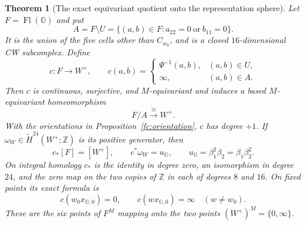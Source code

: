 \documentclass[11pt]{article}
\newtheorem{theorem}{Theorem}[section]
\theoremstyle{definition}
\begin{document}
\begin{theorem}[The exact equivariant quotient onto the representation sphere]
\label{fc:collapse}
Let $F=\operatorname{Fl}(\mathbb O)$ and put
\[
 A=F\setminus U=\{(a,b)\in F:a_{22}=0\ \text{or}\ b_{11}=0\}.
\]
It is the union of the five cells other than $C_{w_0}$, and is a
closed $16$-dimensional CW subcomplex. Define
\begin{equation}
 c:F\longrightarrow W^+,
 \qquad
 c(a,b)=
 \begin{cases}
   \Psi^{-1}(a,b),&(a,b)\in U,\\
   \infty,&(a,b)\in A.
 \end{cases}
 \label{fc:collapse-map}
\end{equation}
Then $c$ is continuous, surjective, and $M$-equivariant and induces
a based $M$-equivariant homeomorphism
\begin{equation}
 F/A\xrightarrow{\ \cong\ }W^+.
 \label{fc:quotient-homeomorphism}
\end{equation}
With the orientations in Proposition~\ref{fc:orientation},
$c$ has degree $+1$. If $\omega_W\in\widetilde H^{24}(W^+;\mathbb Z)$
is its positive generator, then
\begin{equation}
 c_*[F]=[W^+],\qquad c^*\omega_W=u_{\mathbb O},
 \qquad u_{\mathbb O}=\beta_1^2\beta_2=\beta_1\beta_2^2.
 \label{fc:degree-one}
\end{equation}
On integral homology $c_*$ is the identity in degree zero, an
isomorphism in degree $24$, and the zero map on the two copies
of $\mathbb Z$ in each of degrees $8$ and $16$.
On fixed points its exact formula is
\[
 c(w_0x_{\mathbb O,0})=0,\qquad
 c(wx_{\mathbb O,0})=\infty\quad(w\ne w_0).
\]
These are the six points of $F^M$ mapping onto the two points
$(W^+)^M=\{0,\infty\}$.
\end{theorem}
\end{document}
